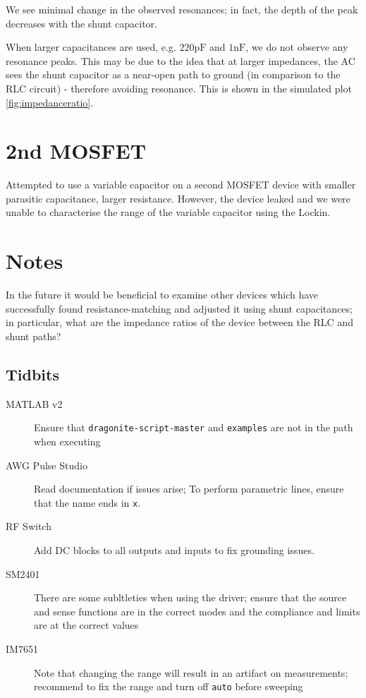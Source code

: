 \documentclass{article}
\begin{document}
\begin{multicols*}{2}
    We see minimal change in the observed resonances; in fact, the depth of the peak decreases with the shunt capacitor.

    When larger capacitances are used, e.g. $220\si{\pico\farad}$ and $1\si{\nano\farad}$, we do not observe any resonance peaks. This may be due to the idea that at larger impedances, the AC sees the shunt capacitor as a near-open path to ground (in comparison to the RLC circuit) - therefore avoiding resonance. This is shown in the simulated plot \autoref{fig:impedanceratio}.

    \section{2nd MOSFET}

    Attempted to use a variable capacitor on a second MOSFET device with smaller parasitic capacitance, larger resistance. However, the device leaked and we were unable to characterise the range of the variable capacitor using the Lockin. 

    \section{Notes}

    In the future it would be beneficial to examine other devices which have successfully found resistance-matching and adjusted it using shunt capacitances; in particular, what are the impedance ratios of the device between the RLC and shunt paths?

    \subsection{Tidbits}

    \begin{description}
        \item[MATLAB v2] Ensure that \verb`dragonite-script-master` and \verb`examples` are not in the path when executing
        \item[AWG Pulse Studio] Read documentation if issues arise; To perform parametric lines, ensure that the name ends in \verb`x`.
        \item[RF Switch] Add DC blocks to all outputs and inputs to fix grounding issues.
        \item[SM2401] There are some subltleties when using the driver; ensure that the source and sense functions are in the correct modes and the compliance and limits are at the correct values
        \item[IM7651] Note that changing the range will result in an artifact on measurements; recommend to fix the range and turn off \verb`auto` before sweeping
    \end{description}


\end{multicols*}
\end{document}
